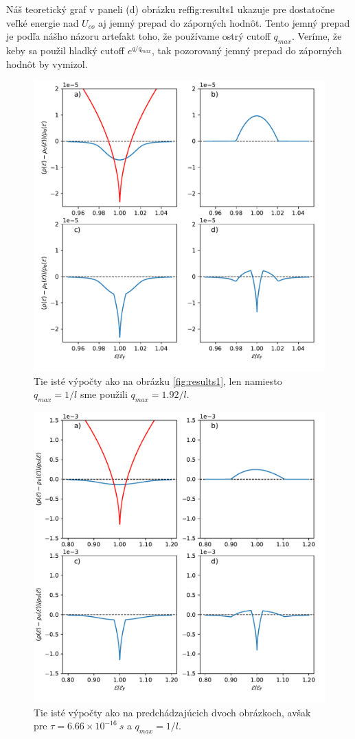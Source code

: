 Náš teoretický graf v paneli (d) obrázku ref{fig:results1} ukazuje pre dostatočne veľké energie nad $U_{co}$ aj jemný prepad do záporných hodnôt. Tento jemný prepad je 
podľa nášho názoru artefakt toho, že používame ostrý cutoff $q_{max}$. Veríme, že keby sa použil hladký cutoff $e^{q/q_{max}}$, tak pozorovaný jemný prepad do záporných hodnôt by vymizol.
\vspace{5cm}



\begin{figure}[t]
\centering
\includegraphics[origin=c,scale=0.6]{grafy/plot_tau_1_c_1_98}
\caption{Tie isté výpočty ako na obrázku \ref{fig:results1}, len namiesto $q_{max} = 1/l$ sme použili $q_{max} = 1.92/l$. }
\label{fig:results2}
\end{figure}

\begin{figure}[H]
\centering
\includegraphics[origin=c,scale=0.6]{grafy/plot_tau_0_1_c_1}
\caption{Tie isté výpočty ako na predchádzajúcich dvoch obrázkoch, avšak pre  $\tau = 6.66 \times 10^{-16} \ s$ a $q_{max} = 1/l$.}
\label{fig:results3}
\end{figure}


